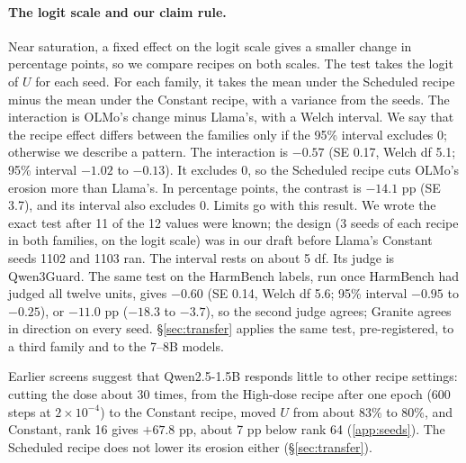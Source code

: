 \documentclass{article}
\begin{document}
\paragraph{The logit scale and our claim rule.} Near saturation, a fixed effect on
the logit scale gives a smaller change in percentage points, so we compare
recipes on both scales. The test takes the logit of $U$ for each seed. For each family, it takes the mean under the Scheduled recipe minus the
mean under the Constant recipe, with a variance from the seeds. The interaction
is OLMo's change minus Llama's, with a Welch interval. We say that the recipe
effect differs between the families only if the 95\% interval excludes 0;
otherwise we describe a pattern. The interaction is $-0.57$ (SE 0.17, Welch df
5.1; 95\% interval $-1.02$ to $-0.13$). It excludes 0, so the Scheduled recipe
cuts OLMo's erosion more than Llama's. In percentage points, the contrast is
$-14.1$ pp (SE 3.7), and its interval also excludes 0. Limits go with this
result. We wrote the exact test after 11 of the 12 values were known; the design
(3 seeds of each recipe in both families, on the logit scale) was in our draft
before Llama's Constant seeds 1102 and 1103 ran. The interval rests on about 5
df. Its judge is Qwen3Guard. The same test on the HarmBench labels, run once
HarmBench had judged all twelve units, gives $-0.60$ (SE 0.14, Welch df 5.6;
95\% interval $-0.95$ to $-0.25$), or $-11.0$ pp ($-18.3$ to $-3.7$), so the
second judge agrees; Granite agrees in direction on every seed.
\S\ref{sec:transfer} applies the same test, pre-registered, to a third family
and to the 7--8B models.

Earlier screens suggest that Qwen2.5-1.5B responds little to other recipe
settings: cutting the dose about 30 times, from the High-dose recipe after one
epoch (600 steps at $2 \times 10^{-4}$) to the Constant recipe, moved $U$ from
about 83\% to 80\%, and Constant, rank 16 gives $+67.8$ pp, about 7 pp below
rank 64 (\cref{app:seeds}). The Scheduled recipe does not lower its erosion
either (\S\ref{sec:transfer}).
\end{document}
